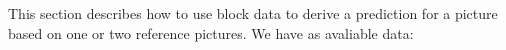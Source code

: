 

\providecommand{\Ref}[0]{\text{\texttt{Ref}}}
\providecommand{\URef}[0]{\mathfrak{R}}
\providecommand{\picWidth}[0]{\text{\texttt{pic\_width}}}
\providecommand{\picHeight}[0]{\text{\texttt{pic\_height}}}
\providecommand{\W}[0]{\text{\texttt{W}}}
\providecommand{\xblen}[0]{\text{\texttt{xblen}}}
\providecommand{\yblen}[0]{\text{\texttt{yblen}}}
\providecommand{\xbsep}[0]{\text{\texttt{xbsep}}}
\providecommand{\ybsep}[0]{\text{\texttt{ybsep}}}
\providecommand{\gmA}[0]{\pmb{\text{A}}}
\providecommand{\gmB}[0]{\pmb{\text{b}}}
\providecommand{\gmC}[0]{\pmb{\text{c}}}
\providecommand{\B}[0]{\text{\texttt{b}}}
\providecommand{\Bx}[0]{\text{\texttt{b.x}}}
\providecommand{\By}[0]{\text{\texttt{b.y}}}
\providecommand{\Bpredmode}[0]{\text{\texttt{b.predmode}}}
\providecommand{\predIntra}[0]{\text{Intra}}
\providecommand{\predInter}[0]{\text{Inter}}
\providecommand{\predGlobal}[0]{\text{Global}}
\providecommand{\Brefsinuse}[0]{\text{\texttt{b.refsinuse}}}
\providecommand{\Bdc}[0]{\text{\texttt{b.dc}}}
\providecommand{\Bv}[0]{\text{\texttt{b.v}}}



This section describes how to use block data to derive a prediction for
a picture based on one or two reference pictures. We have as avaliable
data:

